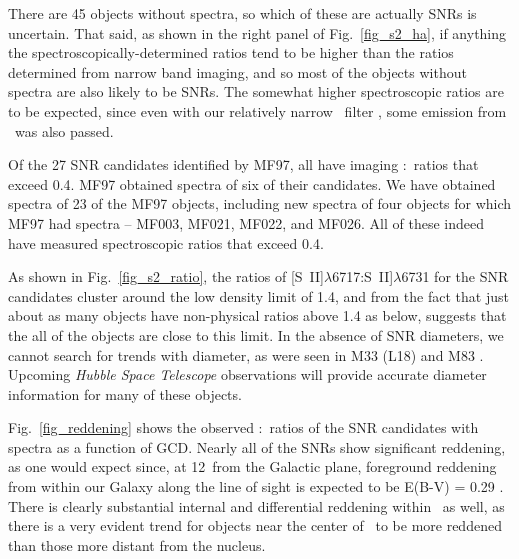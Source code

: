 There are 45 objects without spectra, so which of these are actually SNRs is uncertain.  That said, as shown in the right panel of Fig.\ \ref{fig_s2_ha}, if anything the spectroscopically-determined ratios tend to be higher than the ratios determined from narrow band imaging, and so most of the objects without spectra are also likely to be SNRs.  The somewhat higher spectroscopic ratios are to be expected, since even with our relatively narrow \ha\ filter , some emission from \nii\ was  also passed.   

Of the 27 SNR candidates identified by MF97, all have imaging \sii:\ha\ ratios that exceed 0.4. MF97 obtained spectra of six of their candidates.  We have obtained spectra of 23 of the MF97 objects, including new spectra of four objects for which MF97 had spectra -- MF003, MF021, MF022, and MF026.  All of these indeed have measured spectroscopic ratios that exceed 0.4.



As shown in Fig.\ \ref{fig_s2_ratio}, the ratios of [S~II]$\lambda$6717:S~II]$\lambda$6731 for the SNR candidates cluster around the low density limit of 1.4, and from the fact that just about as many objects have non-physical ratios above 1.4 as below, suggests that the all of the objects are close to this limit.  In the absence of SNR diameters, we cannot search for trends with diameter, as were seen in M33 (L18) and M83 \citep{winkler17}. Upcoming {\it Hubble Space Telescope} observations will provide accurate diameter information for many of these objects.

Fig.\ \ref{fig_reddening} shows the observed \hb:\ha\ ratios of the SNR candidates with spectra as a function of GCD. Nearly all of the SNRs show significant reddening, as one would expect since, at 12\degr\ from the Galactic plane, foreground reddening from within our Galaxy along the line of sight is expected to be E(B-V) = 0.29 \citep{schlafly11}.  There is clearly substantial internal and differential reddening  within \gal\ as well, as there is a very evident trend for objects near the center of \gal\ to be more reddened than those more distant from the nucleus.


